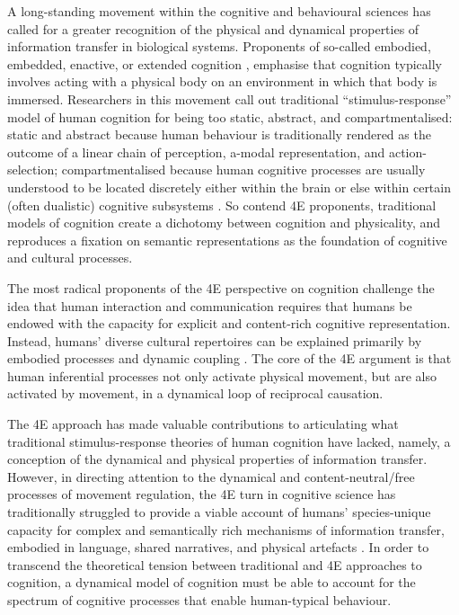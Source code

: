 \begin{CJK}{UTF8}{gbsn}
A long-standing movement within the cognitive and behavioural sciences has called for a greater recognition of the physical and dynamical properties of information transfer in biological systems.  Proponents of so-called embodied, embedded, enactive, or extended cognition \citep[now collectively referred to as ``4E cognition,'' see][]{Menary2010}, emphasise that cognition typically involves acting with a physical body on an environment in which that body is immersed.  Researchers in this movement call out traditional ``stimulus-response'' model of human cognition for being too static, abstract, and compartmentalised: static and abstract because human behaviour is traditionally rendered as the outcome of a linear chain of perception, a-modal representation, and action-selection; compartmentalised because human cognitive processes are usually understood to be located discretely either within the brain or else within certain (often dualistic) cognitive subsystems \citep[e.g., emotional and cognitive, System 1 (fast) and System 2 (slow), implicit and explicit, and so on; cf.][]{Diennes1999,Kahneman2011}.  So contend 4E proponents, traditional models of cognition create a dichotomy between cognition and physicality, and reproduces a fixation on semantic representations as the foundation of cognitive and cultural processes.

The most radical proponents of the 4E perspective on cognition challenge the idea that human interaction and communication requires that humans be endowed with the capacity for explicit and content-rich cognitive representation.  Instead, humans' diverse cultural repertoires can be explained primarily by embodied processes and dynamic coupling \citep{Gallagher2001,Gallagher2008,Fuchs2009}.  The core of the 4E argument is that human inferential processes not only activate physical movement, but are also activated by movement, in a dynamical loop of reciprocal causation.

The 4E approach has made valuable contributions to articulating what traditional stimulus-response theories of human cognition have lacked, namely, a conception of the dynamical and physical properties of information transfer.  However, in directing attention to the dynamical and content-neutral/free processes of movement regulation, the 4E turn in cognitive science has traditionally struggled to provide a viable account of humans' species-unique capacity for complex and semantically rich mechanisms of information transfer, embodied in language, shared narratives, and physical artefacts \citep{Ramstead2016}.  In order to transcend the theoretical tension between traditional and 4E approaches to cognition, a dynamical model of cognition must be able to account for the spectrum of cognitive processes that enable human-typical behaviour.


\end{CJK}
